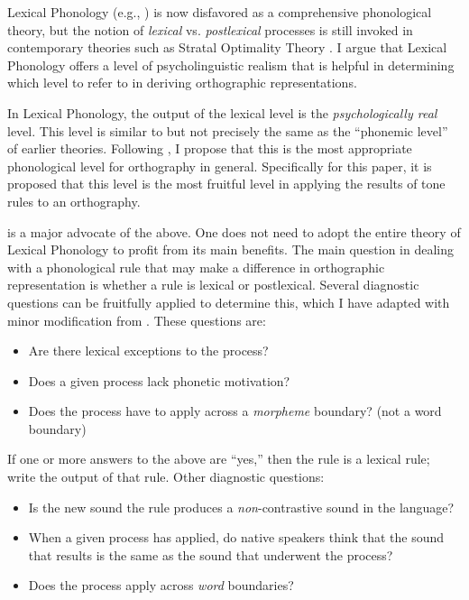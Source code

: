\documentclass[output=paper]{langscibook}
\begin{document}
Lexical Phonology (e.g., \citealt{Pulleyblank1986}) is now disfavored as a comprehensive phonological theory, but the notion of \textit{lexical} vs. \textit{postlexical} processes is still invoked in contemporary theories such as Stratal Optimality Theory \cite{Kiparsky2000,Goldsmith2014}. I argue that Lexical Phonology offers a level of psycholinguistic realism that is helpful in determining which level to refer to in deriving orthographic representations. 

In Lexical Phonology, the output of the lexical level is the \textit{psychologically real} level. This level  is similar to but not precisely the same as the “phonemic level” of earlier theories. Following \citet{Snider2014}, I propose that this is the most appropriate phonological level for orthography in general. Specifically for this paper, it is proposed that this level is the most fruitful level in applying the results of tone rules to an orthography. 

\citet{Snider2014} is a major advocate of the above. One does not need to adopt the entire theory of Lexical Phonology to profit from its main benefits. The main question in dealing with a phonological rule that may make a difference in orthographic representation is whether a rule is lexical or postlexical. Several diagnostic questions can be fruitfully applied to determine this, which I have adapted with minor modification from \citet{Snider2014}. These questions are: 

\begin{itemize}
    \item Are there lexical exceptions to the process? 
    \item Does a given process lack phonetic motivation?
    \item Does the process have to apply across a \textit{morpheme} boundary? (not a word boundary)
\end{itemize}

If one or more answers to the above are “yes,” then the rule is a lexical rule; write the output of that rule. Other diagnostic questions:

\begin{itemize}
    \item Is the new sound the rule produces a \textit{non}{}-contrastive sound in the language? 
    \item When a given process has applied, do native speakers think that the sound that results is the same as the sound that underwent the process?
    \item Does the process apply across \textit{word} boundaries? 
\end{itemize}
\end{document}
